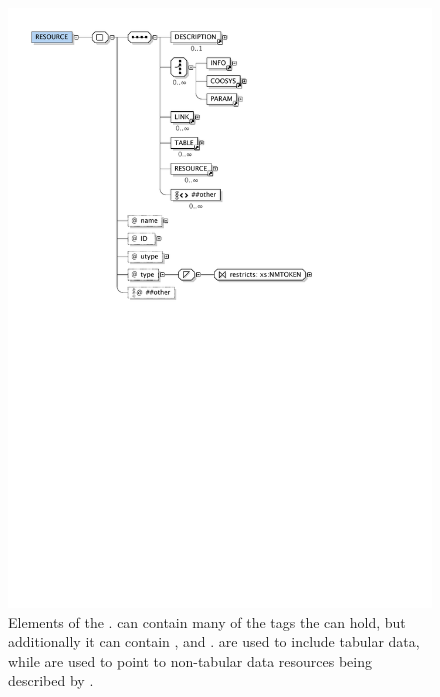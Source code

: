 \begin{figure}[tbp]
	\centering
		\includegraphics[width=\columnwidth]
		{fig/VOTableResourceTag.pdf}
	\caption[Elements of the ]{
		Elements of the .  can
		contain many of the tags the  can hold, but
		additionally it can contain , and 
		.  are used to include
		tabular data, while  are used to point to
		non-tabular data resources being described by
		.
		\oxygenxml
	}
	\label{fig:fig_VOTableResourceTag}
\end{figure}





